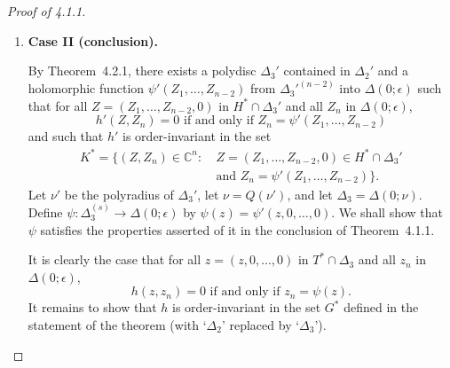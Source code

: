 \documentclass[11pt]{article}
\theoremstyle{plain}
\theoremstyle{definition}
\newcommand{\C}{\mathbb{C}}
\begin{document}
\begin{proof}[Proof of 4.1.1]
\begin{enumerate}
We show that $F'$ satisfies the hypotheses of Theorem~4.2.1 (and
equivalently that $F'$ is order-invariant in $H^*$, near $0$). Let
$Z = (z, Z_{s+1}, \ldots, Z_{n-1})$ be an element of $\Delta_1'$, and
let
\[
N(Z) = P_r(z, Z_{s+1}, \ldots, Z_{n-2}, 1)
+ Z_{n-1} P_{r+1}(z, Z_{s+1}, \ldots, Z_{n-2}, 1) + \cdots.
\]
Then
\[
\begin{aligned}
F'(Z) = F(Q(Z)) &= F(z, Z_{s+1} Z_{n-1}, \ldots, Z_{n-2} Z_{n-1}, Z_{n-1}) \\
&= P_r(z, Z_{s+1} Z_{n-1}, \ldots, Z_{n-2} Z_{n-1}, Z_{n-1}) \\
&\quad + P_{r+1}(z, Z_{s+1} Z_{n-1}, \ldots, Z_{n-2} Z_{n-1}, Z_{n-1}) + \cdots \\
&= Z_{n-1}^r N(Z),
\end{aligned}
\]
as
\[
P_k(z, Z_{s+1} Z_{n-1}, \ldots, Z_{n-2} Z_{n-1}, Z_{n-1}) =
Z_{n-1}^k P_k(z, Z_{s+1}, \ldots, Z_{n-1}, 1).
\]
It can be shown that $N$ is holomorphic; further, we have
\[
N(0) = P_r(0, 0, \ldots, 0, 1) = p_{0, \ldots, 0, r}(0) =
f_{0, \ldots, 0, r} \ne 0,
\]
by (2). Hence there exists $\Delta_2' \subseteq \Delta_1'$ such that
$N \ne 0$ in $\Delta_2'$.

\item \textbf{Case II (conclusion).}

By Theorem~4.2.1, there exists a polydisc $\Delta_3'$ contained in
$\Delta_2'$ and a holomorphic function $\psi'(Z_1, \ldots, Z_{n-2})$
from $\Delta_3'^{(n-2)}$ into $\Delta(0; \epsilon)$ such that for all
$Z = (Z_1, \ldots, Z_{n-2}, 0)$ in $H^* \cap \Delta_3'$ and all $Z_n$
in $\Delta(0; \epsilon)$,
\[
h'(Z, Z_n) = 0 \text{ if and only if }
Z_n = \psi'(Z_1, \ldots, Z_{n-2})
\]
and such that $h'$ is order-invariant in the set
\[
\begin{aligned}
K^* = \{ (Z, Z_n) \in \C^n :\
&Z = (Z_1, \ldots, Z_{n-2}, 0) \in H^* \cap \Delta_3' \\
&\text{and } Z_n = \psi'(Z_1, \ldots, Z_{n-2}) \}.
\end{aligned}
\]
Let $\nu'$ be the polyradius of $\Delta_3'$, let $\nu = Q(\nu')$,
and let $\Delta_3 = \Delta(0; \nu)$. Define
$\psi : \Delta_3^{(s)} \to \Delta(0; \epsilon)$ by
$\psi(z) = \psi'(z, 0, \ldots, 0)$. We shall show that $\psi$
satisfies the properties asserted of it in the conclusion of
Theorem~4.1.1.

It is clearly the case that for all $z = (z, 0, \ldots, 0)$ in
$T^* \cap \Delta_3$ and all $z_n$ in $\Delta(0; \epsilon)$,
\[
h(z, z_n) = 0 \text{ if and only if } z_n = \psi(z).
\]
It remains to show that $h$ is order-invariant in the set $G^*$
defined in the statement of the theorem (with `$\Delta_2$' replaced
by `$\Delta_3$').


\end{enumerate}
\end{proof}
\end{document}
